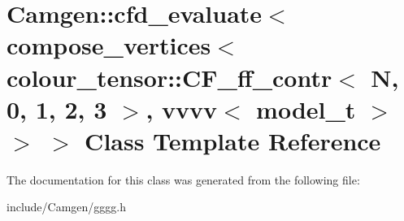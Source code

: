 \hypertarget{a00052}{\section{Camgen\-:\-:cfd\-\_\-evaluate$<$ compose\-\_\-vertices$<$ colour\-\_\-tensor\-:\-:C\-F\-\_\-ff\-\_\-contr$<$ N, 0, 1, 2, 3 $>$, vvvv$<$ model\-\_\-t $>$ $>$ $>$ Class Template Reference}
\label{a00052}
}


The documentation for this class was generated from the following file\-:\begin{DoxyCompactItemize}
\item 
include/\-Camgen/gggg.\-h\end{DoxyCompactItemize}
